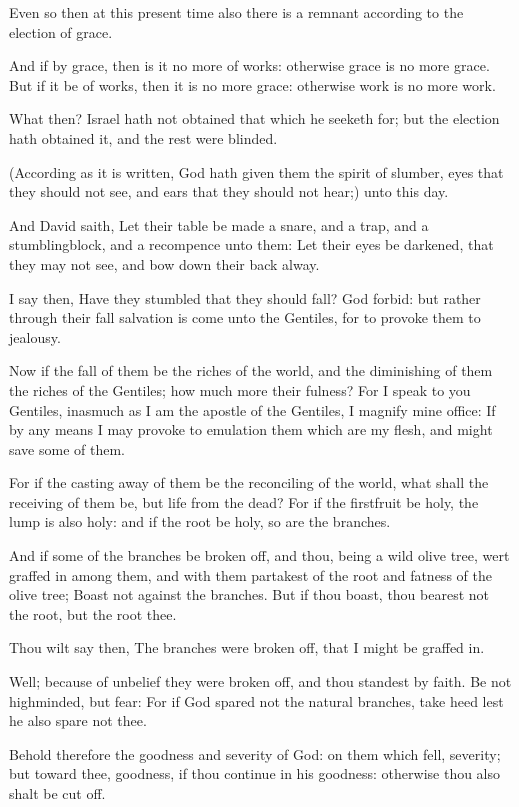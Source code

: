 \verse Even so then at this present time also there is a remnant according to the election of grace.

\verse And if by grace, then is it no more of works: otherwise grace is no more grace. But if it be of works, then it is no more grace: otherwise work is no more work.

\verse What then? Israel hath not obtained that which he seeketh for; but the election hath obtained it, and the rest were blinded.

\verse (According as it is written, God hath given them the spirit of slumber, eyes that they should not see, and ears that they should not hear;) unto this day.

\verse And David saith, Let their table be made a snare, and a trap, and a stumblingblock, and a recompence unto them: \verse Let their eyes be darkened, that they may not see, and bow down their back alway.

\verse I say then, Have they stumbled that they should fall? God forbid: but rather through their fall salvation is come unto the Gentiles, for to provoke them to jealousy.

\verse Now if the fall of them be the riches of the world, and the diminishing of them the riches of the Gentiles; how much more their fulness?  \verse For I speak to you Gentiles, inasmuch as I am the apostle of the Gentiles, I magnify mine office: \verse If by any means I may provoke to emulation them which are my flesh, and might save some of them.

\verse For if the casting away of them be the reconciling of the world, what shall the receiving of them be, but life from the dead?  \verse For if the firstfruit be holy, the lump is also holy: and if the root be holy, so are the branches.

\verse And if some of the branches be broken off, and thou, being a wild olive tree, wert graffed in among them, and with them partakest of the root and fatness of the olive tree; \verse Boast not against the branches. But if thou boast, thou bearest not the root, but the root thee.

\verse Thou wilt say then, The branches were broken off, that I might be graffed in.

\verse Well; because of unbelief they were broken off, and thou standest by faith. Be not highminded, but fear: \verse For if God spared not the natural branches, take heed lest he also spare not thee.

\verse Behold therefore the goodness and severity of God: on them which fell, severity; but toward thee, goodness, if thou continue in his goodness: otherwise thou also shalt be cut off.

